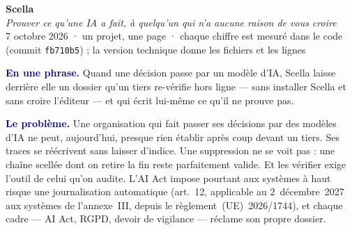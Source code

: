 \documentclass[10pt]{extarticle}
\newcommand{\code}[1]{\texttt{\footnotesize #1}}
\newcommand{\mm}[1]{\textbf{\textcolor{navy}{#1}}}
\begin{document}
\begin{center}
{\LARGE\bfseries\color{navy} Scella}\\[3pt]
{\large\color{grey}\itshape Prouver ce qu'une IA a fait, à quelqu'un qui n'a aucune raison de vous croire}\\[3pt]
{\footnotesize\color{grey} 7 octobre 2026 \; · \; un projet, une page \; · \; chaque chiffre est mesuré dans le code (commit \code{fb710b5}) ; la version technique donne les fichiers et les lignes}
\end{center}
\vspace{1pt}

\begin{these}
\mm{En une phrase.} Quand une décision passe par un modèle d'IA, Scella laisse derrière elle un dossier qu'un
tiers re-vérifie hors ligne --- sans installer Scella et sans croire l'éditeur --- et qui écrit lui-même ce qu'il ne
prouve pas.

\mm{Le problème.} Une organisation qui fait passer ses décisions par des modèles d'IA ne peut, aujourd'hui, presque
rien établir après coup devant un tiers. Ses traces se réécrivent sans laisser d'indice. Une suppression ne se voit
pas : une chaîne scellée dont on retire la fin reste parfaitement valide. Et les vérifier exige l'outil de celui
qu'on audite. L'AI Act impose pourtant aux systèmes à haut risque une journalisation automatique (art.~12, applicable
au 2~décembre~2027 aux systèmes de l'annexe~III, depuis le règlement~(UE)~2026/1744), et chaque cadre --- AI Act, RGPD, devoir de vigilance ---
réclame son propre dossier.
\end{these}
\end{document}
